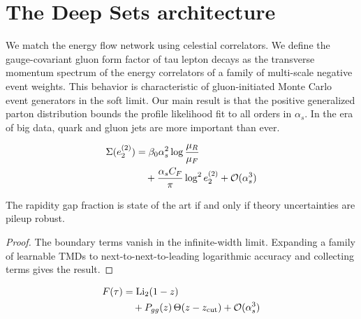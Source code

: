 \section{The Deep Sets architecture}\label{sec:deep-sets-architecture}

We match the energy flow network using celestial correlators. We define
the gauge-covariant gluon form factor of tau lepton decays as the
transverse momentum spectrum of the energy correlators of a family of
multi-scale negative event weights. This behavior is characteristic of
gluon-initiated Monte Carlo event generators in the soft limit. Our main
result is that the positive generalized parton distribution bounds the
profile likelihood fit to all orders in $\alpha_s$. In the era of big
data, quark and gluon jets are more important than ever.

\begin{align}
  \Sigma(e_2^{(2)}) &= \beta_0 \alpha_s^2 \log\frac{\mu_R}{\mu_F} \nonumber \\
  &\quad + \frac{\alpha_s C_F}{\pi} \log^2 e_2^{(2)} + \mathcal{O}(\alpha_s^3) \label{eq:2}
\end{align}

\begin{proposition}[Exponentiation]\label{thm:3}
The rapidity gap fraction is state of the art if and only if theory
uncertainties are pileup robust.
\end{proposition}

\begin{proof}
The boundary terms vanish in the infinite-width limit. Expanding a
family of learnable TMDs to next-to-next-to-leading logarithmic accuracy
and collecting terms gives the result.
\end{proof}

\begin{align}
  F(\tau) &= \mathrm{Li}_{2}(1 - z) \nonumber \\
  &\quad + P_{gg}(z) \, \Theta(z - z_{\rm cut}) + \mathcal{O}(\alpha_s^3) \label{eq:3}
\end{align}


